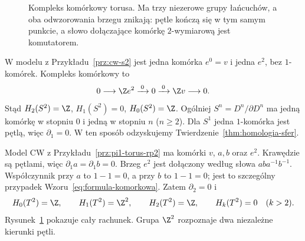 \begin{figure}[!htbp]
\centering
{}
\caption{Kompleks komórkowy torusa. Ma trzy
niezerowe grupy łańcuchów, a oba odwzorowania
brzegu znikają: pętle kończą się w tym
samym punkcie, a słowo dołączające
komórkę $2$-wymiarową jest komutatorem.}
\label{fig:kompleks-torusa}
\end{figure}

\begin{przyklad}
\label{prz:homologia-cw-sfera}
W modelu z
Przykładu~\ref{prz:cw-s2}
jest jedna komórka $e^0=v$
i jedna $e^2$, bez $1$-komórek.
Kompleks komórkowy to
\[
 0\longrightarrow\Z e^2
 \xrightarrow{\;0\;}0
 \xrightarrow{\;0\;}\Z v
 \longrightarrow0.
\]
Stąd $H_2(S^2)=\Z$, $H_1(S^2)=0$,
$H_0(S^2)=\Z$. Ogólniej
$S^n=D^n/\partial D^n$ ma
jedną komórkę w stopniu $0$
i jedną w stopniu $n$
($n\geq2$). Dla $S^1$
jedna $1$-komórka jest pętlą,
więc $\partial_1=0$.
W ten sposób odzyskujemy
Twierdzenie~\ref{thm:homologia-sfer}.
\end{przyklad}

\begin{przyklad}[Torus]
\label{prz:homologia-cw-torus}
Model CW z
Przykładu~\ref{prz:pi1-torus-rp2}
ma komórki $v$,
$a,b$ oraz $e^2$.
Krawędzie są pętlami, więc
$\partial_1a=\partial_1b=0$.
Brzeg $e^2$ jest dołączony
według słowa $aba^{-1}b^{-1}$.
Współczynnik przy $a$
to $1-1=0$, a przy $b$
to $1-1=0$; jest to
szczególny przypadek
Wzoru~\eqref{eq:formula-komorkowa}.
Zatem $\partial_2=0$ i
\[
 H_0(T^2)=\Z,\qquad
 H_1(T^2)=\Z^2,\qquad
 H_2(T^2)=\Z,\qquad
 H_k(T^2)=0\quad(k>2).
\]
Rysunek~\ref{fig:kompleks-torusa}
pokazuje cały rachunek.
Grupa $\Z^2$ rozpoznaje
dwa niezależne kierunki pętli.
\end{przyklad}

